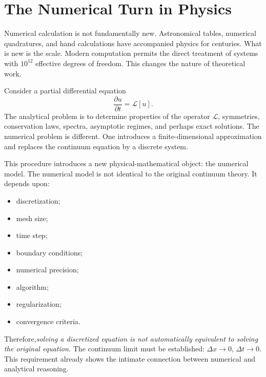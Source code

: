 \section{ The Numerical Turn in Physics}
Numerical calculation is not fundamentally new. Astronomical tables, numerical 
quadratures, and hand calculations have accompanied physics for centuries.
What is new is the scale.
Modern computation permits the direct treatment of systems with $10^{12}$
effective degrees of freedom.
This changes the nature of theoretical work.

Consider a partial differential equation
\[\frac{\partial u}{\partial t}=\mathcal{L}[u].\]
The analytical problem is to determine properties of the operator
$\mathcal{L}$, symmetries, conservation laws, spectra, asymptotic regimes, and
perhaps exact solutions.
The numerical problem is different. One introduces a finite-dimensional approximation
and replaces the continuum equation by a discrete system.

This procedure introduces a new physical-mathematical object: the numerical model.
The numerical model is not identical to the original continuum theory.
It depends upon:
\begin{itemize}
\item discretization;
\item mesh size;
\item time step;
\item boundary conditions;
\item numerical precision;
\item algorithm;
\item regularization;
\item convergence criteria.
\end{itemize}
Therefore,\emph{solving a discretized equation is not automatically equivalent 
to solving the original equation.}
The continuum limit must be established: $\Delta x\rightarrow 0$, 
$\Delta t\rightarrow 0$.
This requirement already shows the intimate connection between numerical 
and analytical reasoning.


